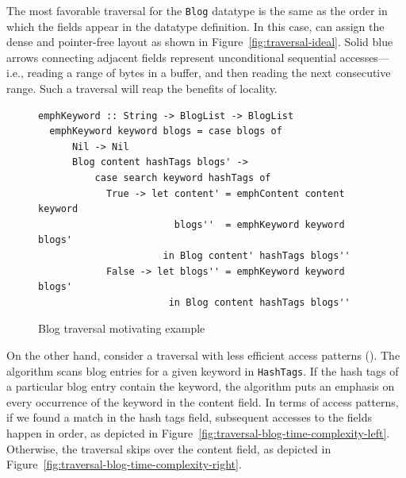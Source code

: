 The most favorable traversal for the \lstinline|Blog| datatype
is the same as the order in
which the fields appear in the datatype definition. In this case, \gibbon{} can
assign the dense and pointer-free layout as shown in Figure~\ref{fig:traversal-ideal}.
Solid blue arrows connecting adjacent fields represent unconditional sequential
accesses---i.e., reading a range of bytes in a buffer, and then reading the next
consecutive range.
Such a traversal will reap the benefits of locality.

\begin{figure}[t]
  \begin{lstlisting}[]
  emphKeyword :: String -> BlogList -> BlogList
  emphKeyword keyword blogs = case blogs of
      Nil -> Nil
      Blog content hashTags blogs' ->
          case search keyword hashTags of
            True -> let content' = emphContent content keyword
                        blogs''  = emphKeyword keyword blogs'
                      in Blog content' hashTags blogs''
            False -> let blogs'' = emphKeyword keyword blogs'
                       in Blog content hashTags blogs''
   \end{lstlisting}
  \caption{Blog traversal motivating example}
  \label{fig:blog-traversal}
\end{figure}



%

%
On the other hand, consider a traversal with less efficient access patterns ().
%
The algorithm scans blog entries for a given keyword in \lstinline|HashTags|.
%
If the hash tags of a particular blog entry contain the keyword, the
algorithm puts an emphasis on every occurrence of the keyword in the content
field.
%
In terms of access patterns, if we found a match in the hash tags field,
subsequent accesses to the fields happen in order, as depicted in Figure~\ref{fig:traversal-blog-time-complexity-left}.
%
Otherwise, the traversal skips over the content field, as depicted in Figure~\ref{fig:traversal-blog-time-complexity-right}.
%

